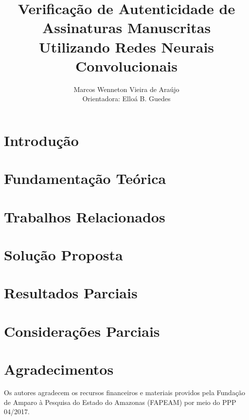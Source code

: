 \documentclass[12pt]{article}
\title{Verificação de Autenticidade de Assinaturas Manuscritas\\ Utilizando Redes Neurais Convolucionais}
\author{Marcos Wenneton Vieira de Araújo\\
Orientadora: Elloá B. Guedes}
\begin{document}
\maketitle
\pagestyle{plain} %

\section{Introdução} \label{sec:introducao}


\section{Fundamentação Teórica} \label{sec:fund-teor}


\section{Trabalhos Relacionados} \label{sec:trab-rel}


\section{Solução Proposta} \label{sec:sol-prop}


\clearpage

\section{Resultados Parciais} \label{sec:res-parc}


\section{Considerações Parciais} \label{sec:cons-parc}


\section*{Agradecimentos}
Os autores agradecem os recursos financeiros e materiais providos pela Fundação de Amparo à Pesquisa do Estado do Amazonas (FAPEAM) por meio do PPP 04/2017.



\end{document}
